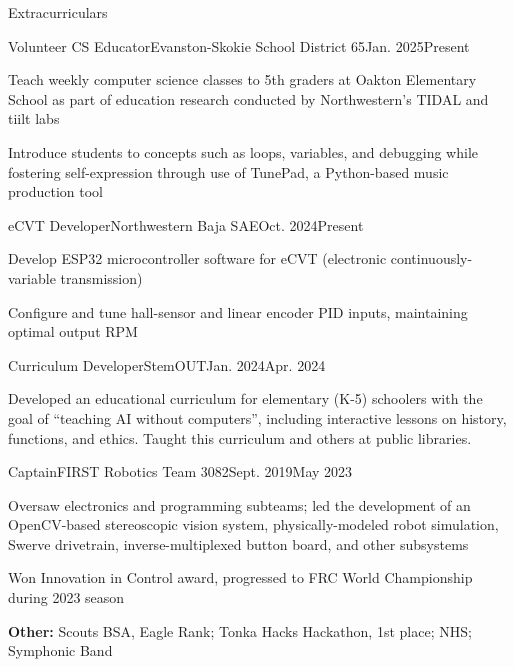 \documentclass{resume} %
\begin{document}
\begin{rSection}{Extracurriculars}
  \begin{rItem}{Volunteer CS Educator}{Evanston-Skokie School District 65}{Jan. 2025}{Present}
    \item Teach weekly computer science classes to 5th graders at Oakton Elementary School as part of education research conducted by Northwestern’s TIDAL and tiilt labs
    \item Introduce students to concepts such as loops, variables, and debugging while fostering self-expression through use of TunePad, a Python-based music production tool
  \end{rItem}

  \begin{rItem}{eCVT Developer}{Northwestern Baja SAE}{Oct. 2024}{Present}
    \item Develop ESP32 microcontroller software for eCVT (electronic continuously-variable transmission)
    \item Configure and tune hall-sensor and linear encoder PID inputs, maintaining optimal output RPM
  \end{rItem}

  \begin{rItem}{Curriculum Developer}{StemOUT}{Jan. 2024}{Apr. 2024}
    \item Developed an educational curriculum for elementary (K-5) schoolers with the goal of ``teaching AI without computers'', including interactive lessons on history, functions, and ethics. Taught this curriculum and others at public libraries.
  \end{rItem}

  \begin{rItem}{Captain}{FIRST Robotics Team 3082}{Sept. 2019}{May 2023}
    \item Oversaw electronics and programming subteams; led the development of an OpenCV-based stereoscopic vision system, physically-modeled robot simulation, Swerve drivetrain, inverse-multiplexed button board, and other subsystems
    \item Won Innovation in Control award, progressed to FRC World Championship during 2023 season
  \end{rItem}

  {\bf Other:} Scouts BSA, Eagle Rank; Tonka Hacks Hackathon, 1st place; NHS; Symphonic Band

\end{rSection}

\end{document}
